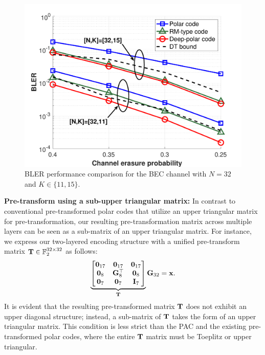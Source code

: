 \documentclass[conference]{IEEEtran}
\begin{document}
 
 
  \begin{figure}[t]
\centering
\includegraphics[width=0.9\columnwidth]{BLER_BEC.pdf}
\caption{BLER performance comparison for the BEC channel with $N=32$ and $K\in \{11,15\}$.}
\label{fig:BLER_BEC} \vspace{-0.5cm}
\end{figure}
\vspace{-0.1cm}



\vspace{0.1cm}

{\bf Pre-transform using a sub-upper triangular matrix:} In contrast to conventional pre-transformed polar codes that utilize an upper triangular matrix for pre-transformation, our resulting pre-transformation matrix across multiple layers can be seen as a sub-matrix of an upper triangular matrix. For instance, we express our two-layered encoding structure with a unified pre-transform matrix ${\bf T}\in \mathbb{F}_2^{32\times 32}$ as follows:
\begin{align}
	[{\bf u}_{\mathcal{F}_2}, {\bf u}_{1}, {\bf u}_{\mathcal{I}_2}]\underbrace{\begin{bmatrix}
{\bf 0}_{17} & {\bf 0}_{17} & {\bf 0}_{17} \\
{\bf 0}_8 &  {\bf G}_8^{\top}& {\bf 0}_8  \\
{\bf 0}_{7} & {\bf 0}_{7} & {\bf I}_{7}   
\end{bmatrix}}_{{\bf T}}{\bf G}_{32}={\bf x}.
\end{align}
It is evident that the resulting pre-transformed matrix ${\bf T}$ does not exhibit an upper diagonal structure; instead, a sub-matrix of ${\bf T}$ takes the form of an upper triangular matrix. This condition is less strict than the PAC and the existing pre-transformed polar codes, where the entire ${\bf T}$ matrix must be  Toeplitz or upper triangular.
\end{document}
